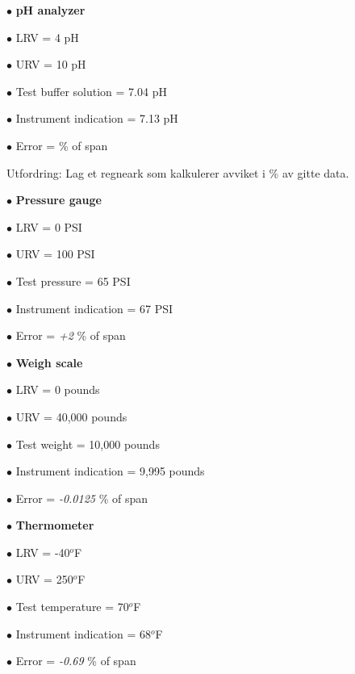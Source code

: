 \vskip 10pt

\medskip
\item{$\bullet$} {\bf pH analyzer}
\item{$\bullet$} LRV = 4 pH
\item{$\bullet$} URV = 10 pH
\item{$\bullet$} Test buffer solution = 7.04 pH
\item{$\bullet$} Instrument indication = 7.13 pH
\item{$\bullet$} Error = \underbar{\hskip 50pt} \% of span
\medskip

\vskip 10pt


\vskip 10pt


Utfordring: Lag et regneark som kalkulerer avviket i \% av gitte data. 







\medskip
\item{$\bullet$} {\bf Pressure gauge}
\item{$\bullet$} LRV = 0 PSI
\item{$\bullet$} URV = 100 PSI 
\item{$\bullet$} Test pressure = 65 PSI 
\item{$\bullet$} Instrument indication = 67 PSI
\item{$\bullet$} Error = {\it +2} \% of span
\medskip

\vskip 10pt

\medskip
\item{$\bullet$} {\bf Weigh scale}
\item{$\bullet$} LRV = 0 pounds
\item{$\bullet$} URV = 40,000 pounds
\item{$\bullet$} Test weight = 10,000 pounds
\item{$\bullet$} Instrument indication = 9,995 pounds
\item{$\bullet$} Error = {\it -0.0125} \% of span
\medskip

\vskip 10pt

\medskip
\item{$\bullet$} {\bf Thermometer}
\item{$\bullet$} LRV = -40$^{o}$F
\item{$\bullet$} URV = 250$^{o}$F
\item{$\bullet$} Test temperature = 70$^{o}$F
\item{$\bullet$} Instrument indication = 68$^{o}$F
\item{$\bullet$} Error = {\it -0.69} \% of span
\medskip


